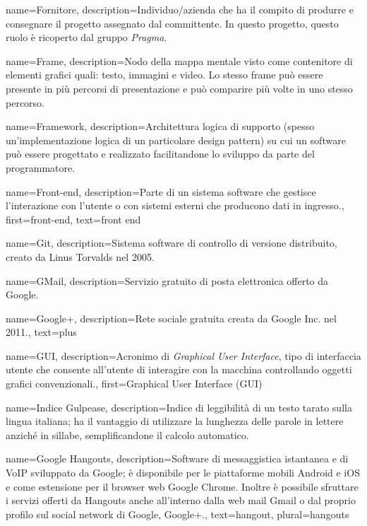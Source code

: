 {
name={Fornitore},
description={Individuo/azienda che ha il compito di produrre e consegnare il progetto assegnato dal committente. In questo progetto, questo ruolo è ricoperto dal gruppo \textit{Pragma}.}
}

{
name={Frame},
description={Nodo della mappa mentale visto come contenitore di elementi grafici quali: testo, immagini e video. Lo stesso frame può essere presente in più percorsi di presentazione e può comparire più volte in uno stesso percorso.}
}

{
name={Framework},
description={Architettura logica di supporto (spesso un'implementazione logica di un particolare design pattern) su cui un software può essere progettato e realizzato facilitandone lo sviluppo da parte del programmatore.}
}

{
name={Front-end},
description={Parte di un sistema software che gestisce l'interazione con l'utente o con sistemi esterni che producono dati in ingresso.},
first={front-end},
text={front end}
}

{
name={Git},
description={Sistema software di controllo di versione distribuito, creato da Linus Torvalds nel 2005.}
}

{
name={GMail},
description={Servizio gratuito di posta elettronica offerto da Google.}
}

{
name={Google+},
description={Rete sociale gratuita creata da Google Inc. nel 2011.},
text={plus}
}

{
name={GUI},
description={Acronimo di \textit{Graphical User Interface}, tipo di interfaccia utente che consente all'utente di interagire con la macchina controllando oggetti grafici convenzionali.},
first={Graphical User Interface (GUI)}
}

{
name={Indice Gulpease},
description={Indice di leggibilità di un testo tarato sulla lingua italiana; ha il vantaggio di utilizzare la lunghezza delle parole in lettere anziché in sillabe, semplificandone il calcolo automatico.}
}

{
name={Google Hangouts},
description={Software di messaggistica istantanea e di VoIP sviluppato da Google; è disponibile per le piattaforme mobili Android e iOS e come estensione per il browser web Google Chrome. Inoltre è possibile sfruttare i servizi offerti da Hangouts anche all'interno dalla web mail Gmail o dal proprio profilo sul social network di Google, Google+.},
text={hangout},
plural={hangouts}
}

